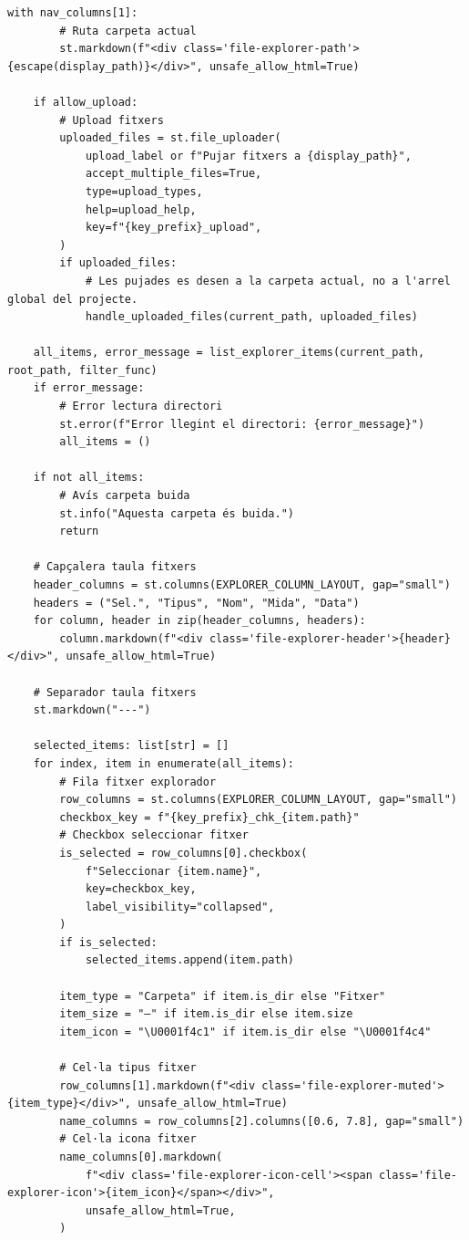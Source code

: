 \documentclass[10pt,a4paper]{article}
\begin{document}
\begin{lstlisting}[style=studioPython,caption={pages/Gestionar\_Arxius.py},label={lst:pages-gestionar-arxius-py}]
    with nav_columns[1]:
        # Ruta carpeta actual
        st.markdown(f"<div class='file-explorer-path'>{escape(display_path)}</div>", unsafe_allow_html=True)

    if allow_upload:
        # Upload fitxers
        uploaded_files = st.file_uploader(
            upload_label or f"Pujar fitxers a {display_path}",
            accept_multiple_files=True,
            type=upload_types,
            help=upload_help,
            key=f"{key_prefix}_upload",
        )
        if uploaded_files:
            # Les pujades es desen a la carpeta actual, no a l'arrel global del projecte.
            handle_uploaded_files(current_path, uploaded_files)

    all_items, error_message = list_explorer_items(current_path, root_path, filter_func)
    if error_message:
        # Error lectura directori
        st.error(f"Error llegint el directori: {error_message}")
        all_items = ()

    if not all_items:
        # Avís carpeta buida
        st.info("Aquesta carpeta és buida.")
        return

    # Capçalera taula fitxers
    header_columns = st.columns(EXPLORER_COLUMN_LAYOUT, gap="small")
    headers = ("Sel.", "Tipus", "Nom", "Mida", "Data")
    for column, header in zip(header_columns, headers):
        column.markdown(f"<div class='file-explorer-header'>{header}</div>", unsafe_allow_html=True)

    # Separador taula fitxers
    st.markdown("---")

    selected_items: list[str] = []
    for index, item in enumerate(all_items):
        # Fila fitxer explorador
        row_columns = st.columns(EXPLORER_COLUMN_LAYOUT, gap="small")
        checkbox_key = f"{key_prefix}_chk_{item.path}"
        # Checkbox seleccionar fitxer
        is_selected = row_columns[0].checkbox(
            f"Seleccionar {item.name}",
            key=checkbox_key,
            label_visibility="collapsed",
        )
        if is_selected:
            selected_items.append(item.path)

        item_type = "Carpeta" if item.is_dir else "Fitxer"
        item_size = "—" if item.is_dir else item.size
        item_icon = "\U0001f4c1" if item.is_dir else "\U0001f4c4"

        # Cel·la tipus fitxer
        row_columns[1].markdown(f"<div class='file-explorer-muted'>{item_type}</div>", unsafe_allow_html=True)
        name_columns = row_columns[2].columns([0.6, 7.8], gap="small")
        # Cel·la icona fitxer
        name_columns[0].markdown(
            f"<div class='file-explorer-icon-cell'><span class='file-explorer-icon'>{item_icon}</span></div>",
            unsafe_allow_html=True,
        )


\end{lstlisting}
\end{document}
